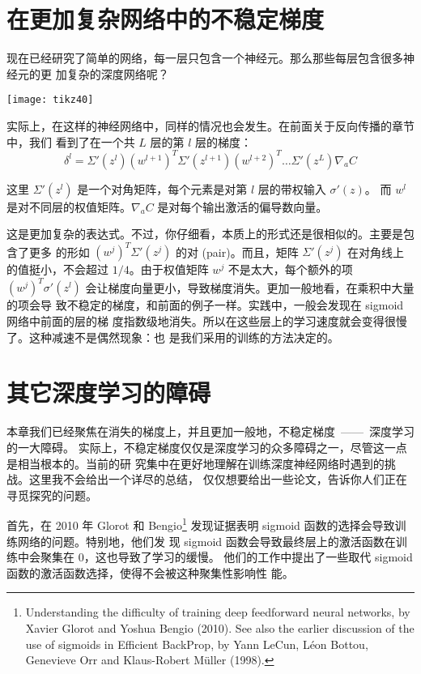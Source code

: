 \section{在更加复杂网络中的不稳定梯度}

现在已经研究了简单的网络，每一层只包含一个神经元。那么那些每层包含很多神经元的更
加复杂的深度网络呢？
\begin{center}
  \texttt{[image: tikz40]}
\end{center}
 
实际上，在这样的神经网络中，同样的情况也会发生。在前面关于反向传播的章节中，我们
看到了在一个共 $L$ 层的第 $l$ 层的梯度：
\begin{equation}
  \delta^l = \Sigma'(z^l) (w^{l+1})^T \Sigma'(z^{l+1}) (w^{l+2})^T \ldots
  \Sigma'(z^L) \nabla_a C
  \label{eq:124}\tag{124}
\end{equation}

这里 $\Sigma'(z^l)$ 是一个对角矩阵，每个元素是对第 $l$ 层的带权输入 $\sigma'(z)$。
而 $w^l$ 是对不同层的权值矩阵。$\nabla_{a} C$ 是对每个输出激活的偏导数向量。
 
这是更加复杂的表达式。不过，你仔细看，本质上的形式还是很相似的。主要是包含了更多
的形如 $(w^j)^T \Sigma' (z^j)$ 的对 (pair)。而且，矩阵 $\Sigma'(z^j)$ 在对角线上
的值挺小，不会超过 $1/4$。由于权值矩阵 $w^j$ 不是太大，每个额外的项 $(w^j)^T
\sigma' (z^l)$ 会让梯度向量更小，导致梯度消失。更加一般地看，在乘积中大量的项会导
致不稳定的梯度，和前面的例子一样。实践中，一般会发现在 sigmoid网络中前面的层的梯
度指数级地消失。所以在这些层上的学习速度就会变得很慢了。这种减速不是偶然现象：也
是我们采用的训练的方法决定的。

\section{其它深度学习的障碍}

本章我们已经聚焦在消失的梯度上，并且更加一般地，不稳定梯度~——~深度学习的一大障碍。
实际上，不稳定梯度仅仅是深度学习的众多障碍之一，尽管这一点是相当根本的。当前的研
究集中在更好地理解在训练深度神经网络时遇到的挑战。这里我不会给出一个详尽的总结，
仅仅想要给出一些论文，告诉你人们正在寻觅探究的问题。
 
首先，在 2010 年 Glorot 和 Bengio\footnote{Understanding the difficulty of
  training deep feedforward neural networks, by Xavier Glorot and Yoshua Bengio
  (2010). See also the earlier discussion of the use of sigmoids in Efficient
  BackProp, by Yann LeCun, Léon Bottou, Genevieve Orr and Klaus-Robert Müller
  (1998).} 发现证据表明 sigmoid 函数的选择会导致训练网络的问题。特别地，他们发
现 sigmoid 函数会导致最终层上的激活函数在训练中会聚集在 $0$，这也导致了学习的缓慢。
他们的工作中提出了一些取代 sigmoid 函数的激活函数选择，使得不会被这种聚集性影响性
能。
 
